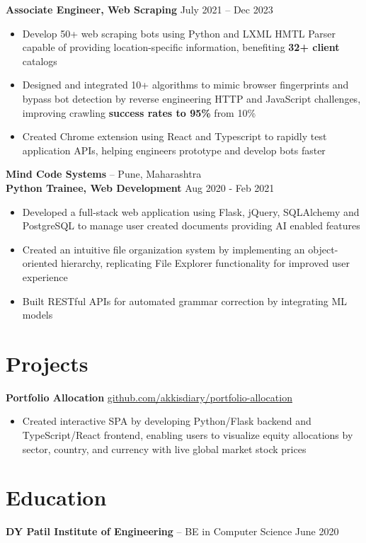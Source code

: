 \documentclass[11pt]{article}       %
\begin{document}
\vspace{-5pt}
\textbf{Associate Engineer, Web Scraping} \hfill July 2021 -- Dec 2023 \\
\vspace{-9pt}
\begin{itemize}
  \item Develop 50+ web scraping bots using Python and LXML HMTL Parser capable of providing location-specific information, benefiting \textbf{32+ client} catalogs \\ 
  \item Designed and integrated 10+ algorithms to mimic browser fingerprints and bypass bot detection by reverse engineering HTTP and JavaScript challenges, improving crawling \textbf{success rates to 95\%} from 10\% \\
  \item Created Chrome extension using React and Typescript to rapidly test application APIs, helping engineers prototype and develop bots faster \\
\end{itemize}

\textbf {Mind Code Systems} -- Pune, Maharashtra \\
\textbf{Python Trainee, Web Development} \hfill Aug 2020 - Feb 2021 \\
\vspace{-9pt}
\begin{itemize}
  \item Developed a full-stack web application using Flask, jQuery, SQLAlchemy and PostgreSQL to manage user created documents providing AI enabled features \\
  \item Created an intuitive file organization system by implementing an object-oriented hierarchy, replicating File Explorer functionality for improved user experience \\
  \item Built RESTful APIs for automated grammar correction by integrating ML models \\
\end{itemize}

\vspace{-18.5pt}

\section*{Projects}
\textbf{Portfolio Allocation} \hfill \href{https://github.com/Akkisdiary/portfolio-allocation}{github.com/akkisdiary/portfolio-allocation} \\
\vspace{-9pt}
\begin{itemize}
  \item Created interactive SPA by developing Python/Flask backend and TypeScript/React frontend, enabling users to visualize equity allocations by sector, country, and currency with live global market stock prices \\
\end{itemize}

\vspace{-18.5pt}

\section*{Education}
\textbf{DY Patil Institute of Engineering} -- BE in Computer Science \hfill June 2020 \\
\end{document}

